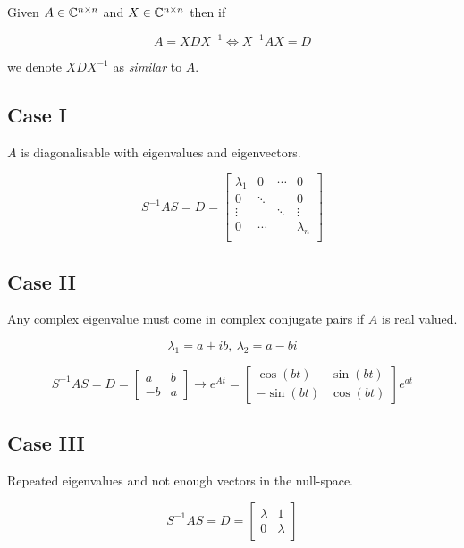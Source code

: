 Given \(A \in \mathbb{C}^{n \times n}\) and \(X \in \mathbb{C}^{n \times n}\) then if

\[
    A = XDX^{-1} \iff X^{-1}AX = D
\]

we denote \(XDX^{-1}\) as \emph{similar} to \(A\).

\subsection{Case I}

\(A\) is diagonalisable with eigenvalues and eigenvectors.

\[
    S^{-1}AS = D = 
    \begin{bmatrix}
        \lambda_1 & 0       & \cdots & 0         \\
        0         & \ddots  &        & 0         \\
        \vdots    &         & \ddots & \vdots    \\
        0         & \cdots  &        & \lambda_n \\
    \end{bmatrix}
\]

\subsection{Case II}

Any complex eigenvalue must come in complex conjugate pairs if \(A\) is real valued.

\[
    \lambda_1 = a + ib, \ \lambda_2 = a - bi
\]

\[ 
    S^{-1}AS = D = 
    \begin{bmatrix}
        a & b \\
        -b & a 
    \end{bmatrix}
    \to
    e^{At}
    = 
    \begin{bmatrix}
        \cos(bt) & \sin(bt) \\
        -\sin(bt) & \cos(bt) 
    \end{bmatrix}
    e^{at}
\]

\subsection{Case III}

Repeated eigenvalues and not enough vectors in the null-space.

\[ 
    S^{-1}AS = D = 
    \begin{bmatrix}
        \lambda & 1 \\
        0 & \lambda 
    \end{bmatrix}
\]



